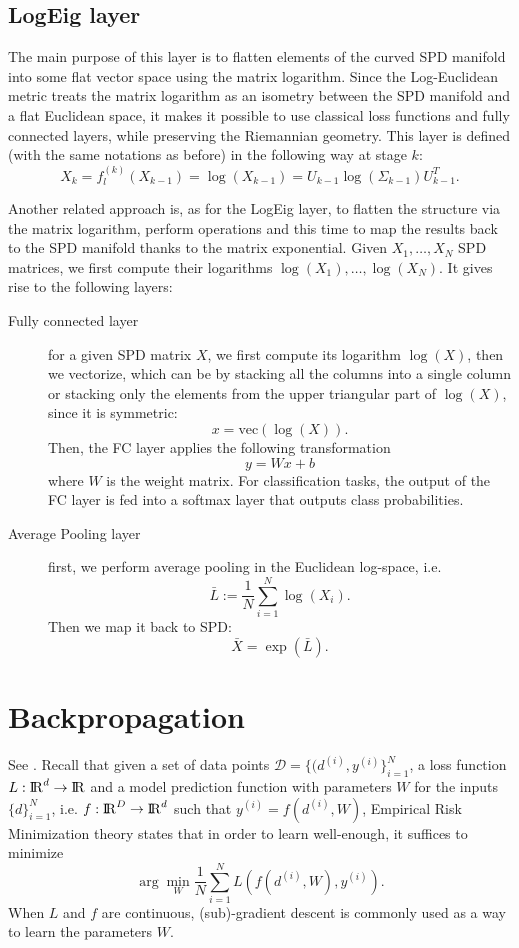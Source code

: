 \documentclass[10pt,a4paper]{book}
\theoremstyle{definition}
\theoremstyle{plain}
\theoremstyle{remark}
\newcommand{\vecto}{\text{vec}}
\def\R{{\rm I\kern-0.16em R}}
\begin{document}
\subsection{LogEig layer}
The main purpose of this layer is to flatten elements of the curved SPD manifold into some flat vector space using the matrix logarithm.
Since the Log-Euclidean metric treats the matrix logarithm as an isometry between the SPD manifold and a flat Euclidean space, it makes it possible to use classical loss functions and fully connected layers, while preserving the Riemannian geometry.
This layer is defined (with the same notations as before) in the following way at stage $k$:
$$X_k=f_{l}^{(k)}(X_{k-1})=\log(X_{k-1})=U_{k-1}\log(\Sigma_{k-1})U_{k-1}^T.$$
\par \medskip
Another related approach is, as for the LogEig layer, to flatten the structure via the matrix logarithm, perform operations and this time to map the results back to the SPD manifold thanks to the matrix exponential.
Given $X_1, \dots, X_N$ SPD matrices, we first compute their logarithms $\log(X_1), \dots, \log(X_N)$.
It gives rise to the following layers:
\begin{description}
    \item[Fully connected layer] for a given SPD matrix $X$, we first compute its logarithm $\log(X)$, then we vectorize, which can be by stacking all the columns into a single column or stacking only the elements from the upper triangular part of $\log(X
    )$, since it is symmetric:
    $$x=\vecto(\log(X)).$$
    Then, the FC layer applies the following transformation
    $$y=Wx+b$$
    where $W$ is the weight matrix. For classification tasks, the output of the FC layer is fed into a softmax layer that outputs class probabilities.

    \item[Average Pooling layer] first, we perform average pooling in the Euclidean log-space, i.e.
    $$\bar{L}:=\frac{1}{N}\sum_{i=1}^{N}\log(X_i).$$
    Then we map it back to SPD:
    $$\bar{X}=\exp(\bar{L}).$$
\end{description}


\section{Backpropagation}
See \cite{ionescu2015matrix}. 
Recall that given a set of data points $\mathcal{D}=\{(d^{(i)},y^{(i)}\}_{i=1}^{N}$, a loss function $L:\R^d\to \R$ and a model prediction function with parameters $W$ for the inputs $\{d\}_{i=1}^{N}$, i.e. $f:\R^{D}\to \R^d$ such that $y^{(i)}=f(d^{(i)},W)$, Empirical Risk Minimization theory states that in order to learn well-enough, it suffices to minimize
$$\arg \min_{W}\frac{1}{N}\sum_{i=1}^{N}L(f(d^{(i)},W),y^{(i)}).$$
When $L$ and $f$ are continuous, (sub)-gradient descent is commonly used as a way to learn the parameters $W$. 
\end{document}
